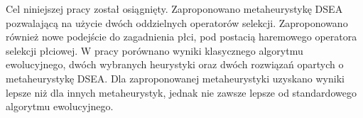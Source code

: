 \documentclass[./FM_mgr.tex]{subfiles}
\begin{document}
Cel niniejszej pracy został osiągnięty.
Zaproponowano metaheurystykę DSEA pozwalającą na użycie dwóch oddzielnych operatorów selekcji. 
Zaproponowano również nowe podejście do zagadnienia płci, pod postacią haremowego operatora selekcji płciowej.
W pracy porównano wyniki klasycznego algorytmu ewolucyjnego, dwóch wybranych heurystyki oraz dwóch rozwiązań opartych o metaheurystykę DSEA.
Dla zaproponowanej metaheurystyki uzyskano wyniki lepsze niż dla innych metaheurystyk, jednak nie zawsze lepsze od standardowego algorytmu ewolucyjnego.
\end{document}
